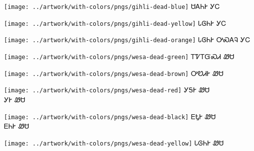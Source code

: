 \documentclass[avery5371]{flashcards}%
\begin{document}
    \begin{flashcard}{
        \texttt{[image: ../artwork/with-colors/pngs/gihli-dead-blue]}
    }
        \Huge ᏌᎪᏂᎨ ᎩᏟ
    \end{flashcard}

    \begin{flashcard}{
        \texttt{[image: ../artwork/with-colors/pngs/gihli-dead-yellow]}
    }
        \Huge ᏓᎶᏂᎨ ᎩᏟ
    \end{flashcard}

    \begin{flashcard}{
        \texttt{[image: ../artwork/with-colors/pngs/gihli-dead-orange]}
    }
        \Huge ᏓᎶᏂᎨ ᎤᏍᎪᎸ ᎩᏟ
    \end{flashcard}

    \begin{flashcard}{
        \texttt{[image: ../artwork/with-colors/pngs/wesa-dead-green]}
    }
        \Huge ᎢᏤᎢᏳᏍᏗ ᏪᏌ
    \end{flashcard}

    \begin{flashcard}{
        \texttt{[image: ../artwork/with-colors/pngs/wesa-dead-brown]}
    }
        \Huge ᎤᏬᏗᎨ ᏪᏌ
    \end{flashcard}

    \begin{flashcard}{
        \texttt{[image: ../artwork/with-colors/pngs/wesa-dead-red]}
    }
        \Huge ᎩᎦᎨ ᏪᏌ\\ᎩᎨ ᏪᏌ
    \end{flashcard}

    \begin{flashcard}{
        \texttt{[image: ../artwork/with-colors/pngs/wesa-dead-black]}
    }
        \Huge ᎬᎿᎨ ᏪᏌ\\ᎬᏂᎨ ᏪᏌ
    \end{flashcard}

    \begin{flashcard}{
        \texttt{[image: ../artwork/with-colors/pngs/wesa-dead-yellow]}
    }
        \Huge ᏓᎶᏂᎨ ᏪᏌ
    \end{flashcard}
\end{document}
